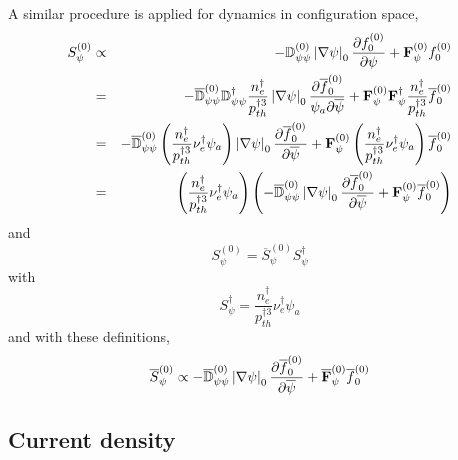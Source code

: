A similar procedure is applied for dynamics in configuration space, 
\begin{eqnarray}
S_{\psi }^{\left( 0\right) } &\propto &-\mathbb{D}_{\psi \psi }^{\left(
0\right) }\left| \nabla \psi \right| _{0}\frac{\partial f_{0}^{\left(
0\right) }}{\partial \psi }+\mathbf{F}_{\psi }^{\left( 0\right)
}f_{0}^{\left( 0\right) }  \notag \\
&=&-\overline{\mathbb{D}}_{\psi \psi }^{\left( 0\right) }\mathbb{D}_{\psi
\psi }^{\dag }\frac{n_{e}^{\dag }}{p_{th}^{\dag 3}}\left| \nabla \psi
\right| _{0}\frac{\partial \overline{f}_{0}^{\left( 0\right) }}{\psi
_{a}\partial \overline{\psi }}+\mathbf{F}_{\psi }^{\left( 0\right) }\mathbf{F%
}_{\psi }^{\dag }\frac{n_{e}^{\dag }}{p_{th}^{\dag 3}}\overline{f}%
_{0}^{\left( 0\right) }  \notag \\
&=&-\overline{\mathbb{D}}_{\psi \psi }^{\left( 0\right) }\left( \frac{%
n_{e}^{\dag }}{p_{th}^{\dag 3}}\nu _{e}^{\dag }\psi _{a}\right) \left|
\nabla \psi \right| _{0}\frac{\partial \overline{f}_{0}^{\left( 0\right) }}{%
\partial \overline{\psi }}+\mathbf{F}_{\psi }^{\left( 0\right) }\left( \frac{%
n_{e}^{\dag }}{p_{th}^{\dag 3}}\nu _{e}^{\dag }\psi _{a}\right) \overline{f}%
_{0}^{\left( 0\right) }  \notag \\
&=&\left( \frac{n_{e}^{\dag }}{p_{th}^{\dag 3}}\nu _{e}^{\dag }\psi
_{a}\right) \left( -\overline{\mathbb{D}}_{\psi \psi }^{\left( 0\right)
}\left| \nabla \psi \right| _{0}\frac{\partial \overline{f}_{0}^{\left(
0\right) }}{\partial \overline{\psi }}+\mathbf{F}_{\psi }^{\left( 0\right) }%
\overline{f} _{0}^{\left( 0\right) }\right)
\end{eqnarray}
and 
\begin{equation}
S_{\psi }^{\left( 0\right) }=\overline{S}_{\psi }^{\left( 0\right) }S_{\psi
}^{\dag }
\end{equation}
with 
\begin{equation}
S_{\psi }^{\dag }=\frac{n_{e}^{\dag }}{p_{th}^{\dag 3}}\nu _{e}^{\dag }\psi
_{a}
\end{equation}
and with these definitions, 
\begin{equation}
\overline{S}_{\psi }^{\left( 0\right) }\propto -\overline{\mathbb{D}}_{\psi
\psi }^{\left( 0\right) }\left| \nabla \psi \right| _{0}\frac{\partial 
\overline{f}_{0}^{\left( 0\right) }}{\partial \overline{\psi }}+\overline{%
\mathbf{F}}_{\psi }^{\left( 0\right) }\overline{f}_{0}^{\left( 0\right) }
\end{equation}

\subsection{Current density}

